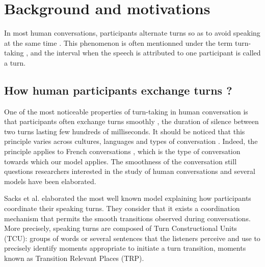 
\section{Background and motivations}
\label{backgd}



In most human conversations, participants
alternate turns so as to avoid speaking at the same
time \citep{sacks_simplest_1974}. This phenomenon is often mentionned under
the term turn-taking \citep{sacks_simplest_1974}, and the interval when
the speech is attributed to one participant is called a
turn. 

\subsection{How human participants exchange turns ?}
\label{social_psychology}

One of the most noticeable properties of turn-taking in human conversation is that participants often exchange turns
smoothly \citep{heldner_pauses_2010}, the duration of silence between two turns
lasting few hundreds of milliseconds. 
It should be noticed that this principle
varies across cultures, languages and types of conversation \citep{oconnell_turntaking_2008,stivers_universals_2009}.
Indeed, the principle applies to French conversations \citep{mondada_multimodal_2007}, 
which is the type of conversation towards which our model applies.
The smoothness of the conversation still questions researchers interested in the study of human conversations 
and several models have been elaborated. %
 

Sacks et al. \citep{sacks_simplest_1974} elaborated the most well known model explaining how participants coordinate their speaking turns.
They consider that it exists a coordination mechanism that permits the smooth transitions observed during conversations.
More precisely, speaking turns are composed of Turn Constructional Units (TCU): groups of words or several sentences that the listeners perceive and use to precisely identify moments appropriate to initiate a turn transition, moments known as Transition Relevant Places (TRP).

